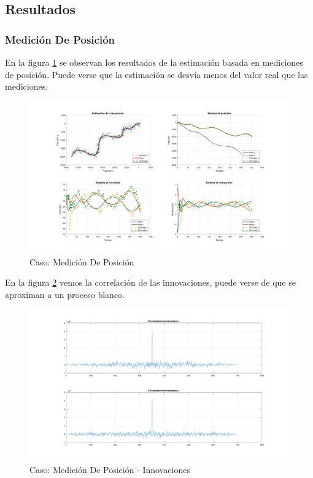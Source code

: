 	\subsection{Resultados}
		\subsubsection{Medición De Posición}
			En la figura \ref{fig:ej2a} se observan los resultados de la estimación basada en mediciones de posición. Puede verse que la estimación se desvía menos del valor real que las mediciones.

		\begin{figure}[H]
			\centering
			\includegraphics[width=1.0\textwidth,keepaspectratio]{Figuras/graf_ej2a.pdf}
			\caption{Caso: Medición De Posición}
			\label{fig:ej2a}
		\end{figure}
		
		En la figura \ref{fig:ej2a_innov} vemos la correlación de las innovaciones, puede verse de que se aproximan a un proceso blanco.
		
		\begin{figure}[H]
			\centering
			\includegraphics[width=1.0\textwidth,keepaspectratio]{Figuras/covinn_ej2a.pdf}
			\caption{Caso: Medición De Posición - Innovaciones}
			\label{fig:ej2a_innov}
		\end{figure}
		
